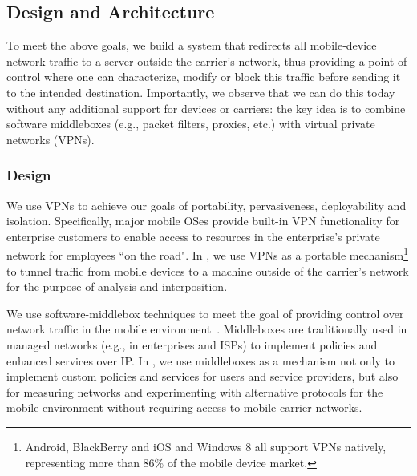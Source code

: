 \subsection{Design and Architecture}
To meet the above goals, we build a system that redirects all mobile-device 
network traffic to a server outside the carrier's network, thus providing a point of control 
where one can characterize, modify or block this traffic before sending it to the intended 
destination. Importantly, we observe that we can do this today without any additional 
support for devices or carriers: the key idea is to combine software middleboxes (e.g., 
packet filters, proxies, etc.) with virtual private networks (VPNs). 




\subsubsection{Design}
We use VPNs to achieve our goals of portability, pervasiveness, deployability 
and isolation. Specifically, major
 mobile OSes provide built-in VPN functionality for enterprise
 customers to enable access to resources in
 the enterprise's private network for employees ``on the road". 
In \meddle, we use VPNs as a portable mechanism\footnote{Android, BlackBerry and iOS and Windows 8 all support VPNs natively, representing more than 86\% of the mobile device market\cite{gartner-phone-share}.} to tunnel traffic from mobile devices to a machine outside of the carrier's network for the purpose of analysis and interposition. 

We use software-middlebox techniques to meet the goal of providing control over network traffic in the mobile 
environment~\cite{sherry:middleboxes}. Middleboxes are traditionally used in managed networks (e.g., in enterprises and ISPs) to implement policies and enhanced services over IP. In \meddle, we use middleboxes as a mechanism not only to implement custom policies and services for users and service providers, but also for measuring networks and experimenting with alternative protocols for the mobile environment without requiring access to mobile carrier networks. 


